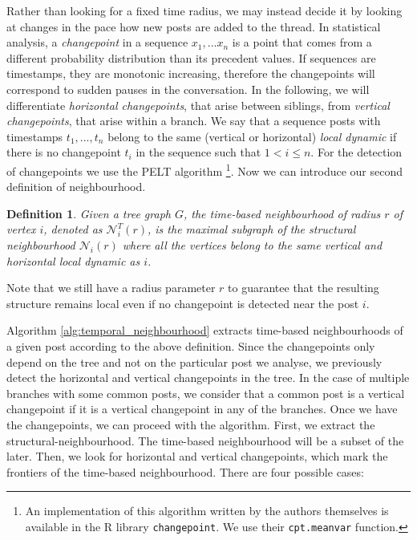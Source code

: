 \documentclass[conference]{IEEEtran}
\newtheorem{definition}{Definition}
\begin{document}
Rather than looking for a fixed time radius, we may instead decide it by looking at changes in the pace how new posts are added to the thread. In statistical analysis, a \textit{changepoint} in a sequence $x_1,...x_n$ is a point that comes from a different probability distribution than its precedent values. If sequences are timestamps, they are monotonic increasing, therefore the changepoints will correspond to sudden pauses in the conversation. In the following, we will differentiate \textit{horizontal changepoints}, that arise between siblings, from \textit{vertical changepoints}, that arise within a branch. We say that a sequence posts with timestamps $t_1,...,t_n$ belong to the same (vertical or horizontal) \textit{local dynamic} if there is no changepoint $t_i$ in the sequence such that $1 < i \leq n$. For the detection of changepoints we use the PELT algorithm \cite{Killick2012}\footnote{An implementation of this algorithm written by the authors themselves is available in the R library \texttt{changepoint}. We use their \texttt{cpt.meanvar} function.}. Now we can introduce our second definition of neighbourhood.
\begin{definition}
Given a tree graph $G$, the \textit{time-based neighbourhood} of radius $r$ of vertex $i$, denoted as $\mathcal{N}_{i}^T(r)$, is the maximal subgraph of the structural neighbourhood $\mathcal{N}_i(r)$ where all the vertices  belong to the same vertical and horizontal local dynamic as $i$.
\end{definition}
Note that we still have a radius parameter $r$ to guarantee that the resulting structure remains local even if no changepoint is detected near the post $i$. 

Algorithm \ref{alg:temporal_neighbourhood} extracts time-based neighbourhoods of a given post according to the above definition. Since the changepoints only depend on the tree and not on the particular post we analyse, we previously detect the horizontal and vertical changepoints in the tree. In the case of multiple branches with some common posts, we consider that a common post is a vertical changepoint if it is a vertical changepoint in any of the branches. Once we have the changepoints, we can proceed with the algorithm. First, we extract the structural-neighbourhood. The time-based neighbourhood will be a subset of the later. Then, we look for horizontal and vertical changepoints, which mark the frontiers of the time-based neighbourhood. There are four possible cases:
\end{document}
